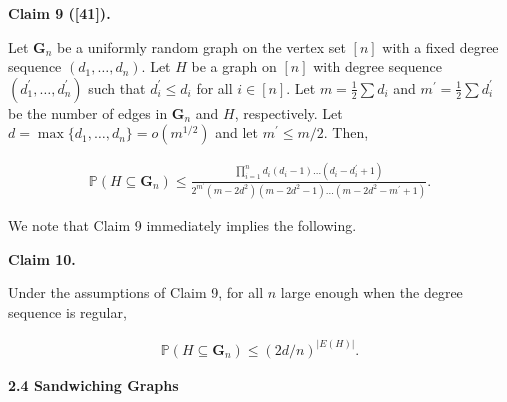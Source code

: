 

\par\medskip\noindent\textbf{
Claim 9 ([41]). 
}\par



Let $\mathbf{G}_{n}$ be a uniformly random graph on the vertex set $[n]$ with a fixed degree sequence $(d_{1},\ldots,d_{n})$. Let $H$ be a graph on $[n]$ with degree sequence $(d^{\prime}_{1},\ldots,d^{\prime}_{n})$ such that $d^{\prime}_{i}\leq d_{i}$ for all $i\in[n]$. Let $m=\frac{1}{2}\sum d_{i}$ and $m^{\prime}=\frac{1}{2}\sum d^{\prime}_{i}$ be the number of edges in $\mathbf{G}_{n}$ and $H$, respectively. Let $d=\max\{d_{1},\ldots,d_{n}\}=o(m^{1/2})$ and let $m^{\prime}\leq m/2$. Then,\par


\[\begin{gathered}
\mathbb{P}(H\subseteq\mathbf{G}_{n})\leq\frac{\prod_{i=1}^{n}d_{i}(d_{i}-1)\ldots(d_{i}-d^{\prime}_{i}+1)}{2^{m^{\prime}}(m-2d^{2})(m-2d^{2}-1)\ldots(m-2d^{2}-m^{\prime}+1)}.
\end{gathered}\]






We note that Claim 9 immediately implies the following.\par





\par\medskip\noindent\textbf{
Claim 10. 
}\par



Under the assumptions of Claim 9, for all $n$ large enough when the degree sequence is regular,\par


\[\begin{gathered}
\mathbb{P}(H\subseteq\mathbf{G}_{n})\leq\left(2d/n\right)^{|E(H)|}.
\end{gathered}\]







\par\medskip\noindent\textbf{
2.4 Sandwiching Graphs}\par




